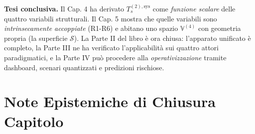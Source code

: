 \Hypoth{} \textbf{Tesi conclusiva.} Il Cap. 4 ha derivato
\(T_s^{(2),\text{sys}}\) come \emph{funzione scalare} delle quattro
variabili strutturali. Il Cap. 5 mostra che quelle variabili sono
\emph{intrinsecamente accoppiate} (R1-R6) e abitano uno spazio
\(\mathbb{V}^{(4)}\) con geometria propria (la superficie
\(\mathcal{S}\)). La Parte II del libro è ora chiusa: l'apparato
unificato è completo, la Parte III ne ha verificato l'applicabilità sui
quattro attori paradigmatici, e la Parte IV può procedere alla
\emph{operativizzazione} tramite dashboard, scenari quantizzati e
predizioni rischiose.



\section{Note Epistemiche di Chiusura
Capitolo}\label{note-epistemiche-di-chiusura-capitolo}


